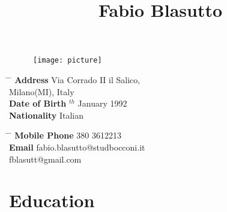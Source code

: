 \documentclass[10pt]{article} %
\begin{document}





\title{Fabio Blasutto} %
\begin{figure}[hl]
	\texttt{[image: picture]}
\end{figure}




\pagestyle{empty}
\parbox{0.5\textwidth}{ %
\begin{tabbing} %
\hspace{3cm} \= \hspace{4cm} \= \kill %
{\bf Address} \> Via Corrado II il Salico,\\ %
\> Milano(MI), Italy\\ %
{\bf Date of Birth} $^{th}$ January 1992 \\ %
{\bf Nationality} \> Italian %
\end{tabbing}}
\hfill %
\parbox{0.5\textwidth}{ %
\begin{tabbing} %
\hspace{3cm} \= \hspace{4cm} \= \kill %
{\bf Mobile Phone}  380 3612213 \\ %
{\bf Email} \> fabio.blasutto@studbocconi.it \\ 
\> fblasutt@gmail.com%
\end{tabbing}}



\section{Education}

\end{document}
